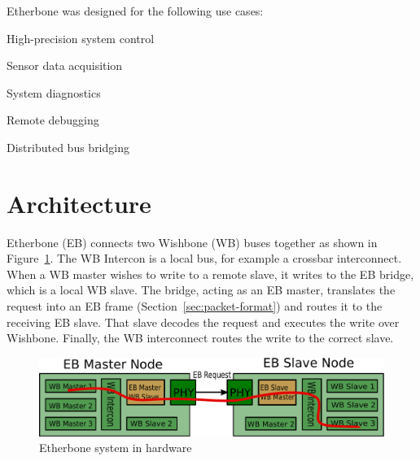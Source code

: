 \documentclass{article}
\newenvironment{packed_itemize}{
\begin{itemize}
  \setlength{\itemsep}{1pt}
  \setlength{\parskip}{0pt}
  \setlength{\parsep}{0pt}
}{\end{itemize}}
\begin{document}

Etherbone was designed for the following use cases:
\begin{packed_itemize}
\item High-precision system control
\item Sensor data acquisition
\item System diagnostics
\item Remote debugging
\item Distributed bus bridging
\end{packed_itemize}



\section{Architecture}

Etherbone (EB) connects two Wishbone (WB) buses together as shown in
Figure~\ref{fig:hw-system}.
The WB Intercon is a local bus, for example a crossbar interconnect.
When a WB master wishes to write to a remote slave, 
it writes to the EB bridge,
which is a local WB slave.
The bridge, acting as an EB master, 
translates the request into an EB frame
(Section~\ref{sec:packet-format}) and routes it to
the receiving EB slave.
That slave decodes the request and executes the write over Wishbone.
Finally, the WB interconnect routes the write to the correct slave.

\begin{figure}[t]
\centering%
\includegraphics[width=\columnwidth]{system}
\caption{Etherbone system in hardware}
\label{fig:hw-system}
\end{figure}
\end{document}
